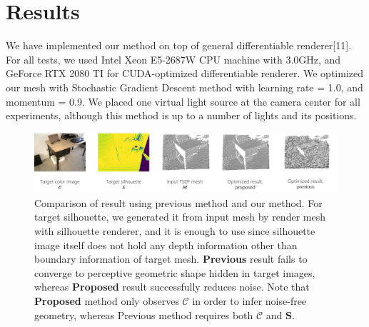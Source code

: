 \section{Results}
We have implemented our method on top of general differentiable renderer[11]. 
For all tests, we used Intel Xeon E5-2687W CPU machine with 3.0GHz, and GeForce RTX 2080 TI for CUDA-optimized differentiable renderer. 
We optimized our mesh with Stochastic Gradient Descent method with learning rate = 1.0, and momentum = 0.9. 
We placed one virtual light source at the camera center for all experiments, although this method is up to a number of lights and its positions.

\begin{figure}
    \centering
    \includegraphics[width=\textwidth]{figures/4_result_comparison_with_previous_method.png}
    \caption{Comparison of result using previous method and our method. For target silhouette, we generated it from input mesh by render mesh with silhouette renderer, and it is enough to use since silhouette image itself does not hold any depth information other than boundary information of target mesh. \textbf{Previous} result fails to converge to perceptive geometric shape hidden in target images, whereas \textbf{Proposed} result successfully reduces noise. Note that \textbf{Proposed} method only observes $\mathbf{\mathcal{C}}$ in order to infer noise-free geometry, whereas Previous method requires both $\mathbf{\mathcal{C}}$ and $\mathbf{S}$.}
\end{figure}

